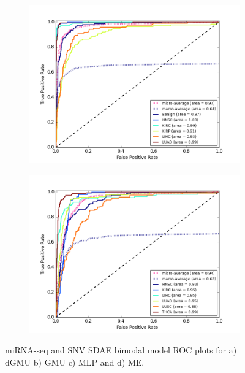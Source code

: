 \begin{figure}[H]
\begin{subfigure}[b]{0.49\textwidth}
         \includegraphics[width=\textwidth]{img/m_s/m_s_sdae_mlp_roc.png}
         \caption{}
     \end{subfigure}
     \begin{subfigure}[b]{0.49\textwidth}
         \centering
         \includegraphics[width=\textwidth]{img/m_s/m_s_sdae_moe_roc.png}
         \caption{}
     \end{subfigure}
        \caption{miRNA-seq and SNV SDAE bimodal model ROC plots for a) dGMU b) GMU c) MLP and d) ME.}
        \label{fig:m_s_sdae_roc}
\end{figure}


